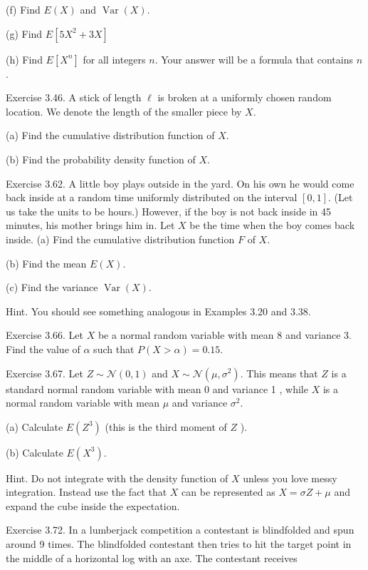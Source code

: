 \documentclass[10pt]{article}
\begin{document}
(f) Find $E(X)$ and $\operatorname{Var}(X)$.

(g) Find $E\left[5 X^{2}+3 X\right]$

(h) Find $E\left[X^{n}\right]$ for all integers $n$. Your answer will be a formula that contains $n$.

\hfill \break
Exercise 3.46. A stick of length $\ell$ is broken at a uniformly chosen random location. We denote the length of the smaller piece by $X$.

(a) Find the cumulative distribution function of $X$.

(b) Find the probability density function of $X$.


\hfill \break
Exercise 3.62. A little boy plays outside in the yard. On his own he would come back inside at a random time uniformly distributed on the interval $[0,1]$. (Let us take the units to be hours.) However, if the boy is not back inside in 45 minutes, his mother brings him in. Let $X$ be the time when the boy comes back inside. (a) Find the cumulative distribution function $F$ of $X$.

(b) Find the mean $E(X)$.

(c) Find the variance $\operatorname{Var}(X)$.

Hint. You should see something analogous in Examples 3.20 and 3.38.


\hfill \break
Exercise 3.66. Let $X$ be a normal random variable with mean 8 and variance 3. Find the value of $\alpha$ such that $P(X>\alpha)=0.15$.

\hfill \break
Exercise 3.67. Let $Z \sim \mathcal{N}(0,1)$ and $X \sim \mathcal{N}\left(\mu, \sigma^{2}\right)$. This means that $Z$ is a standard normal random variable with mean 0 and variance 1 , while $X$ is a normal random variable with mean $\mu$ and variance $\sigma^{2}$.

(a) Calculate $E\left(Z^{3}\right)$ (this is the third moment of $Z$ ).

(b) Calculate $E\left(X^{3}\right)$.

Hint. Do not integrate with the density function of $X$ unless you love messy integration. Instead use the fact that $X$ can be represented as $X=\sigma Z+\mu$ and expand the cube inside the expectation.

\hfill \break
Exercise 3.72. In a lumberjack competition a contestant is blindfolded and spun around 9 times. The blindfolded contestant then tries to hit the target point in the middle of a horizontal log with an axe. The contestant receives
\end{document}
